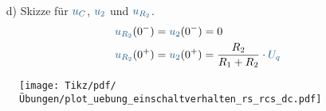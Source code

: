 {\begin{minipage}{0.5\textwidth}
\begin{itemize}
    \item[d)] Skizze für $\ecv{u_C}$, $\ecv{u_2}$ und $\ecv{u_{R_2}}$.
    \begin{align*}
        \ecv{u_{R_2}}(0^-) &= \ecv{u_2}(0^-) = 0 \\
        \ecv{u_{R_2}}(0^+) &= \ecv{u_2}(0^+) = \frac{R_2}{R_1+R_2} \cdot \ecv{U_q}%
    \end{align*}
\end{itemize}
\end{minipage}%
\begin{minipage}{0.5\textwidth}
\begin{figure}[H]
    \texttt{[image: Tikz/pdf/Übungen/plot\_uebung\_einschaltverhalten\_rs\_rcs\_dc.pdf]}
\end{figure}
\end{minipage}
\newpage %
}



